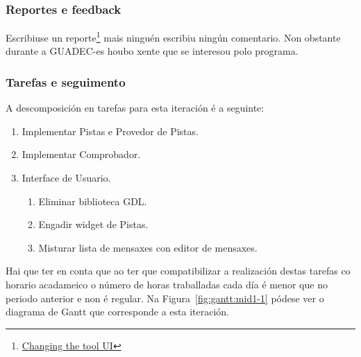 \subsubsection{Reportes e feedback}
Escribiuse un reporte\footnote{\href{http://aquelando.info/changing-the-tool-ui/}{Changing the tool UI}} mais ninguén escribiu ningún comentario. Non obstante durante a GUADEC-es houbo xente que se interesou polo programa.

\subsubsection{Tarefas e seguimento}

A descomposición en tarefas para esta iteración é a seguinte:

\begin{enumerate}[label=\bfseries WBS 1.\arabic*]
  \item Implementar Pistas e Provedor de Pistas.
  \item Implementar Comprobador.
  \item Interface de Usuario.
    \begin{enumerate}[label=\bfseries WBS 1.3.\arabic*]
      \item Eliminar biblioteca GDL.
      \item Engadir widget de Pistas.
      \item Misturar lista de mensaxes con editor de mensaxes.
    \end{enumerate}
\end{enumerate}

Hai que ter en conta que ao ter que compatibilizar a realización destas tarefas co horario acadameico o número de horas traballadas cada día é menor que no periodo anterior e non é regular. Na Figura~\ref{fig:gantt:mid1-1} pódese ver o diagrama de Gantt que corresponde a esta iteración.

